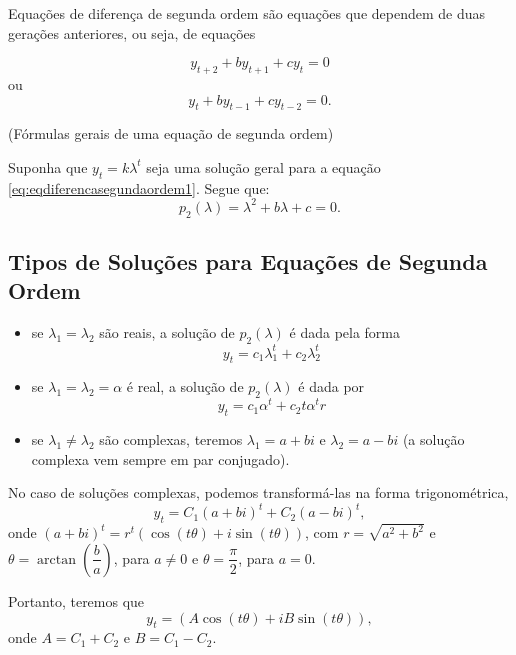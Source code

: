 \begin{definition}
Equações de diferença de segunda ordem são equações que dependem de duas gerações anteriores, ou seja, de equações

\begin{equation}\label{eq:eqdiferencasegundaordem1}
y_{t+2} + by_{t+1} + cy_{t} = 0
\end{equation}
ou
\begin{equation}\label{eq:eqdiferencasegundaordem2}
y_{t} + by_{t-1} + cy_{t-2} = 0.
\end{equation}

(Fórmulas gerais de uma equação de segunda ordem) 
\end{definition}

Suponha que $y_{t} = k\lambda^{t}$ seja uma solução geral para a equação \eqref{eq:eqdiferencasegundaordem1}. Segue que:
$$p_2(\lambda) = \lambda^{2} + b\lambda + c = 0.$$

\subsection{Tipos de Soluções para Equações de Segunda Ordem}


\begin{itemize}
\item se $\lambda_{1} = \lambda_{2}$ são reais, a solução de $p_2(\lambda)$ é dada pela forma
$$y_{t} = c_1\lambda_{1}^{t} + c_2\lambda_{2}^{t}$$ 
\item se $\lambda_{1} = \lambda_{2} = \alpha$ é real, a solução de $p_2(\lambda)$ é dada por
$$y_{t} = c_1\alpha^{t} + c_2t\alpha^{t}r$$ 
\item se $\lambda_1 \ne \lambda_2$ são complexas, teremos $\lambda_{1} = a+bi$ e $\lambda_{2} = a-bi$ (a solução complexa vem sempre em par conjugado). 
\end{itemize}

No caso de soluções complexas, podemos transformá-las na forma trigonométrica,
$$y_{t} = C_1(a + bi)^{t} + C_2 (a - bi)^{t},$$
onde $(a + bi)^{t} = r^{t} (\cos(t\theta) + i\sin(t\theta))$, com $r = \sqrt{a^2+b^2}$ e $\theta = \arctan\left(\dfrac{b}{a}\right)$, para $a \ne 0$ e $\theta = \dfrac{\pi}{2}$, para $a=0$.

Portanto, teremos que 
$$y_{t} = (A\cos(t\theta) + i B\sin(t\theta)),$$
onde $A = C_1 + C_2$ e $B = C_1 - C_2$.

